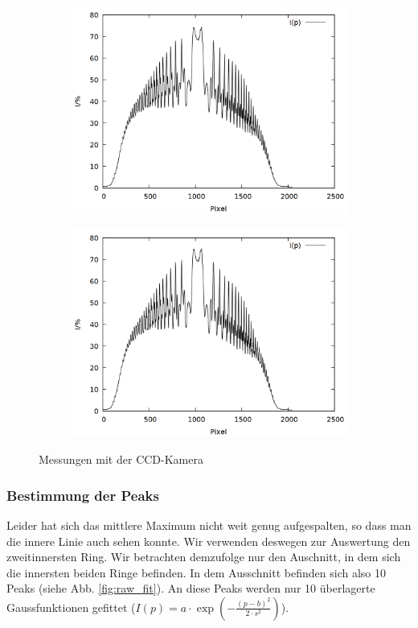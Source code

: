 \begin{figure}
\begin{subfigure}{0.45\textwidth}
\includegraphics[width=\textwidth]{data/zeeman/out_8_4_raw.png}
\end{subfigure}
\begin{subfigure}{0.45\textwidth}
\includegraphics[width=\textwidth]{data/zeeman/out_8_5_raw.png}
\end{subfigure}
\caption{Messungen mit der CCD-Kamera}
\label{fig:raw}
\end{figure}

\subsubsection{Bestimmung der Peaks}
Leider hat sich das mittlere Maximum nicht weit genug aufgespalten, so dass man die innere Linie auch sehen konnte. Wir verwenden deswegen zur Auswertung den zweitinnersten Ring. Wir betrachten demzufolge nur den Auschnitt, in dem sich die innersten beiden Ringe befinden. In dem Ausschnitt befinden sich also 10 Peaks (siehe Abb. \ref{fig:raw_fit}). An diese Peaks werden nur 10 überlagerte Gaussfunktionen gefittet ($I(p) = a\cdot \exp\left(-\frac{(p-b)^2}{2\cdot s^2}\right)$).


